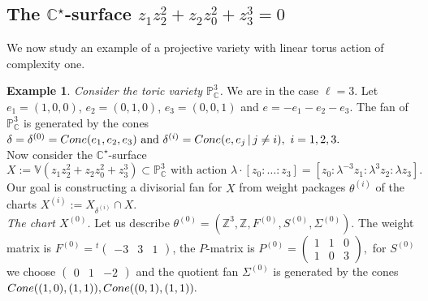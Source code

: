 \documentclass[11pt, reqno]{amsart}
\theoremstyle{plain}
\theoremstyle{definition}
\newtheorem{example}[theorem]{Example}
\theoremstyle{remark}
\begin{document}
\subsection{The $\mathbb{C}^{\star}$-surface $z_{1}z_{2}^{2} + z_{2}z_{0}^{2} + z_{3}^{3} = 0$}\label{sec-exex}

 
We now study an example of a projective variety with linear torus action of complexity one. 
\\


\begin{example} 
\emph{Consider the toric variety $\mathbb{P}^{3}_{\mathbb{C}}$.} We are in the case $\ell = 3$. 
Let $e_{1} =  (1, 0,0)$, $e_{2} =  (0, 1,0)$, $e_{3} =  (0, 0, 1)$ and $e =  -e_{1}-e_{2}-e_{3}$. 
The fan of $\mathbb{P}^{3}_{\mathbb{C}}$ is generated
by the cones 
$\delta =  \delta^{(0)} =  {\rm Cone}( e_{1}, e_{2}, e_{3})
\text{ and } \delta^{(i)} =  {\rm Cone}(e , e_{j}\,|\, j\neq i),\,\, i = 1,2,3.$
\\

Now consider the $\mathbb{C}^{\star}$-surface 
$$X:= \mathbb{V}(z_{1}z_{2}^{2} + z_{2}z_{0}^{2} + z_{3}^{3}) \subset \mathbb{P}_{\mathbb{C}}^{3}
\text{ with action }\lambda\cdot [z_{0}: \ldots : z_{3}]  =  [z_{0}: \lambda^{-3}z_{1} : \lambda^{3}z_{2}: \lambda z_{3}].$$
Our goal is constructing  a divisorial fan for $X$ from weight packages $\theta^{(i)}$ of the  charts $X^{(i)}:= X_{\delta^{(i)}}\cap X$. 
\\

\emph{The chart $X^{(0)}$.}
Let us describe  $\theta^{(0)}=  (\mathbb{Z}^{3}, \mathbb{Z}, F^{(0)}, S^{(0)}, \Sigma^{(0)})$. 
The weight matrix is $F^{(0)} =   {}^{t}\begin{pmatrix} -3 & 3 & 1
\end{pmatrix}$, the $P$-matrix is  
$ P^{(0)} =  \begin{pmatrix}
1 & 1 & 0\\
1 & 0 & 3
\end{pmatrix},$
for $S^{(0)}$ we choose $\begin{pmatrix}
0 & 1 & -2
\end{pmatrix}$
and  the quotient fan $\Sigma^{(0)}$ is generated by the cones
${\rm Cone}((1,0), (1,1)), {\rm Cone}((0,1),(1,1)).$
\\


\end{example}
\end{document}
